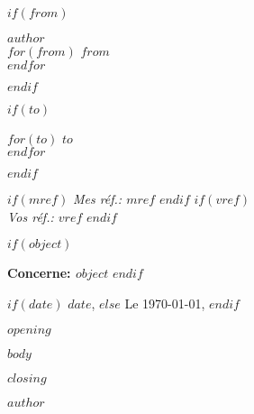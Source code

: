 \documentclass[12pt]{article}
\begin{document}
\pagestyle{empty}

%
%
$if(from)$
\begin{minipage}{.5\linewidth}
	\textbf{$author$}\\
	$for(from)$
		$from$\\
	$endfor$
\end{minipage}
$endif$

%
%
$if(to)$
\begin{flushright}
	\begin{minipage}[t]{.4\linewidth}
		$for(to)$
			$to$\\
		$endfor$
	\end{minipage}
\end{flushright}
$endif$

%
%
$if(mref)$
\textit{Mes réf.: $mref$}
$endif$
$if(vref)$
\\\textit{Vos réf.: $vref$}
$endif$

% 
%
$if(object)$
\par\bigskip\textbf{Concerne: $object$}
$endif$

%
%
\begin{flushright}
\begin{minipage}[t]{.4\linewidth}
	$if(date)$
		$date$,
	$else$
		Le \dayofweekname{\day}{\month}{\year} \today,
	$endif$
\end{minipage}
\end{flushright}


\par\vspace{10mm} 
$opening$

\vspace{1cm}
$body$

\vspace{1cm}
$closing$


%
%
\bigskip
\bigskip
\begin{flushright}
\begin{minipage}[t]{.4\linewidth}
	$author$
\end{minipage}
\end{flushright}
\end{document}
